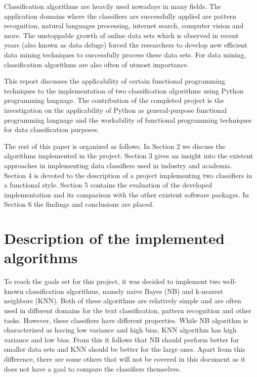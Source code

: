 \documentclass{llncs}
\begin{document}
Classification algorithms are heavily used nowadays in many fields. The application domains where the classifiers are successfully applied are pattern recognition, natural languages processing, internet search, computer vision and more. The unstoppable growth of online data sets which is observed in recent years (also known as data deluge) forced the researchers to develop new efficient data mining techniques to successfully process these data sets. For data mining, classification algorithms are also often of utmost importance.

This report discusses the applicability of certain functional programming techniques to the implementation of two classification algorithms using Python programming language. The contribution of the completed project is the investigation on the applicability of Python as general-purpose functional programming language and the workability of functional programming techniques for data classification purposes.

The rest of this paper is organized as follows. In Section 2 we discuss the algorithms implemented in the project. Section 3 gives an insight into the existent approaches in implementing data classifiers used in industry and academia. Section 4 is devoted to the description of a project implementing two classifiers in a functional style. Section 5 contains the evaluation of the developed implementation and its comparison with the other existent software packages. In Section 6 the findings and conclusions are placed.

\section{Description of the implemented algorithms}

To reach the goals set for this project, it was decided to implement two well-known classification algorithms, namely naive Bayes (NB) and k-nearest neighbors (KNN). Both of these algorithms are relatively simple and are often used in different domains for the text classification, pattern recognition and other tasks. However, these classifiers have different properties. While NB algorithm is characterized as having low variance and high bias, KNN algorithm has high variance and low bias. From this it follows that NB should perform better for smaller data sets and KNN should be better for the large ones. Apart from this difference, there are some others that will not be covered in this document as it does not have a goal to compare the classifiers themselves. 
\end{document}
